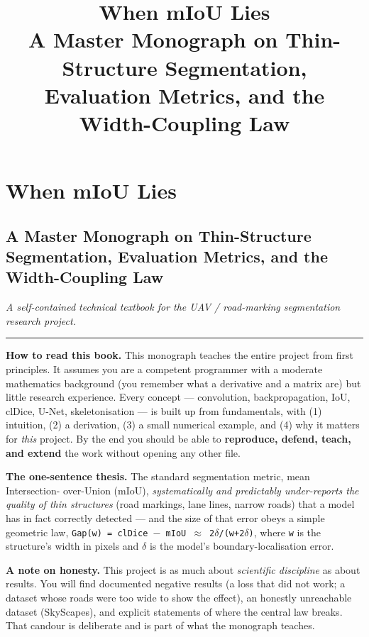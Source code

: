 \documentclass[11pt]{article}
\title{\textbf{When mIoU Lies}\\[4pt]\large A Master Monograph on Thin-Structure
Segmentation, Evaluation Metrics, and the Width-Coupling Law}
\author{}\date{}
\begin{document}
\maketitle\thispagestyle{empty}
\tableofcontents\clearpage
\clearpage\section*{When mIoU Lies}

\subsection*{A Master Monograph on Thin-Structure Segmentation, Evaluation Metrics, and the Width-Coupling Law}

\textit{A self-contained technical textbook for the UAV / road-marking segmentation research project.}

\vspace{3pt}\hrule\vspace{3pt}

\textbf{How to read this book.} This monograph teaches the entire project from first principles. It assumes you are a competent programmer with a moderate mathematics background (you remember what a derivative and a matrix are) but little research experience. Every concept --- convolution, backpropagation, IoU, clDice, U-Net, skeletonisation --- is built up from fundamentals, with (1) intuition, (2) a derivation, (3) a small numerical example, and (4) why it matters for \textit{this} project. By the end you should be able to \textbf{reproduce, defend, teach, and extend} the work without opening any other file.

\textbf{The one-sentence thesis.} The standard segmentation metric, mean Intersection- over-Union (mIoU), \textit{systematically and predictably under-reports the quality of thin structures} (road markings, lane lines, narrow roads) that a model has in fact correctly detected --- and the size of that error obeys a simple geometric law, \texttt{Gap(w) = clDice $-$ mIoU $\approx$ 2$\delta$/(w+2$\delta$)}, where \texttt{w} is the structure's width in pixels and \texttt{$\delta$} is the model's boundary-localisation error.

\textbf{A note on honesty.} This project is as much about \textit{scientific discipline} as about results. You will find documented negative results (a loss that did not work; a dataset whose roads were too wide to show the effect), an honestly unreachable dataset (SkyScapes), and explicit statements of where the central law breaks. That candour is deliberate and is part of what the monograph teaches.
\end{document}

